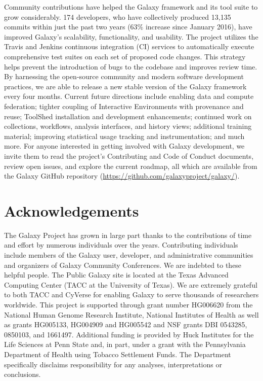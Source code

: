 Community contributions have helped the Galaxy framework and its tool suite to grow considerably. 174 developers, who have collectively produced 13,135 commits within just the past two years (63\% increase since January 2016), have improved Galaxy’s scalability, functionality, and usability. The project utilizes the Travis and Jenkins continuous integration (CI) services to automatically execute comprehensive test suites on each set of proposed code changes. This strategy helps prevent the introduction of bugs to the codebase and improves review time. By harnessing the open-source community and modern software development practices, we are able to release a new stable version of the Galaxy framework every four months. Current future directions include enabling data and compute federation; tighter coupling of Interactive Environments with provenance and reuse; ToolShed installation and development enhancements; continued work on collections, workflows, analysis interfaces, and history views; additional training material; improving statistical usage tracking and instrumentation; and much more. For anyone interested in getting involved with Galaxy development, we invite them to read the project’s Contributing and Code of Conduct documents, review open issues, and explore the current roadmap, all which are available from the Galaxy GitHub repository (\url{https://github.com/galaxyproject/galaxy/}).


\section*{Acknowledgements}
The Galaxy Project has grown in large part thanks to the contributions of time and effort by numerous individuals over the years. Contributing individuals include members of the Galaxy user, developer, and administrative communities and organizers of Galaxy Community Conferences. We are indebted to these helpful people. The Public Galaxy site is located at the Texas Advanced Computing Center (TACC at the University of Texas). We are extremely grateful to both TACC and CyVerse for enabling Galaxy to serve thousands of researchers worldwide. This project is supported through grant number HG006620 from the National Human Genome Research Institute, National Institutes of Health as well as grants HG005133, HG004909 and HG005542 and NSF grants DBI 0543285, 0850103, and 1661497. Additional funding is provided by Huck Institutes for the Life Sciences at Penn State and, in part, under a grant with the Pennsylvania Department of Health using Tobacco Settlement Funds. The Department specifically disclaims responsibility for any analyses, interpretations or conclusions.

\footnotesize


\normalsize

